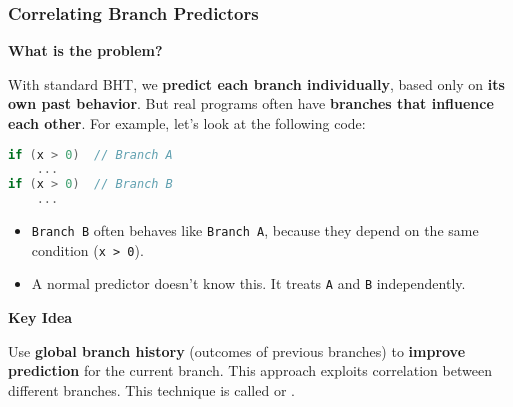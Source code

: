 \subsubsection{Correlating Branch Predictors}

\begin{flushleft}
    \textcolor{Green3}{ \textbf{What is the problem?}}
\end{flushleft}
With standard BHT, we \textbf{predict each branch individually}, based only on \textbf{its own past behavior}. But real programs often have \textbf{branches that influence each other}. For example, let's look at the following code:
\begin{lstlisting}[language=c]
if (x > 0)  // Branch A
    ...
if (x > 0)  // Branch B
    ...
\end{lstlisting}
\begin{itemize}
    \item \texttt{Branch B} often behaves like \texttt{Branch A}, because they depend on the same condition (\texttt{x > 0}).
    \item A normal predictor doesn't know this. It treats \texttt{A} and \texttt{B} independently.
\end{itemize}

\highspace
\begin{flushleft}
    \textcolor{Green3}{ \textbf{Key Idea}}
\end{flushleft}
Use \textbf{global branch history} (outcomes of previous branches) to \textbf{improve prediction} for the current branch. This approach exploits correlation between different branches. This technique is called  or .

